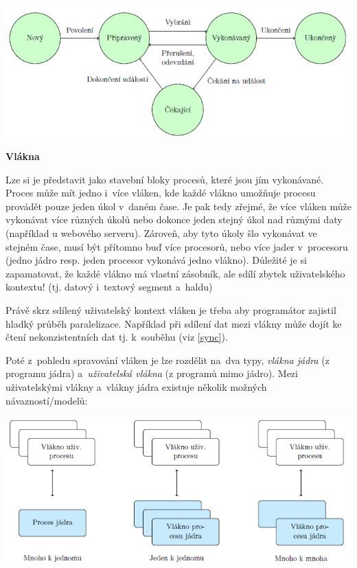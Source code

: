 \begin{center}
    \includegraphics[scale=1]{images/proc_states.png}
\end{center}

\begin{Large}
    \vspace{0,5cm}
    \textbf{Vlákna}
\end{Large}

Lze si je představit jako stavební bloky procesů, které jsou jím vykonávané. Proces může mít jedno i~více vláken, kde každé vlákno umožňuje procesu provádět pouze jeden úkol v~daném čase. Je pak tedy zřejmé, že více vláken může vykonávat více různých úkolů nebo dokonce jeden stejný úkol nad různými daty (například u webového serveru). Zároveň, aby tyto úkoly šlo vykonávat ve~ stejném čase, musí být přítomno buď více procesorů, nebo více jader v~procesoru (jedno jádro resp. jeden procesor vykonává jedno vlákno). Důležité je si zapamatovat, že každé vlákno má vlastní zásobník, ale sdílí zbytek uživatelského kontextu! (tj. datový i~textový segment a~haldu)

\vspace{0,5cm}

Právě skrz sdílený uživatelský kontext vláken je třeba aby programátor zajistil hladký průběh paralelizace. Například při sdílení dat mezi vlákny může dojít ke čtení nekonzistentních dat tj. k~souběhu (viz \ref{sync}). 

\vspace{0,5cm}

Poté z~pohledu spravování vláken je lze rozdělit na~dva typy, \emph{vlákna jádra} (z programu jádra) a~\emph{uživatelská vlákna} (z programů mimo jádro). Mezi uživatelskými vlákny a~vlákny jádra existuje několik možných návazností/modelů:

\begin{center}
    \includegraphics[scale=1]{images/thread_models.png}
\end{center}

